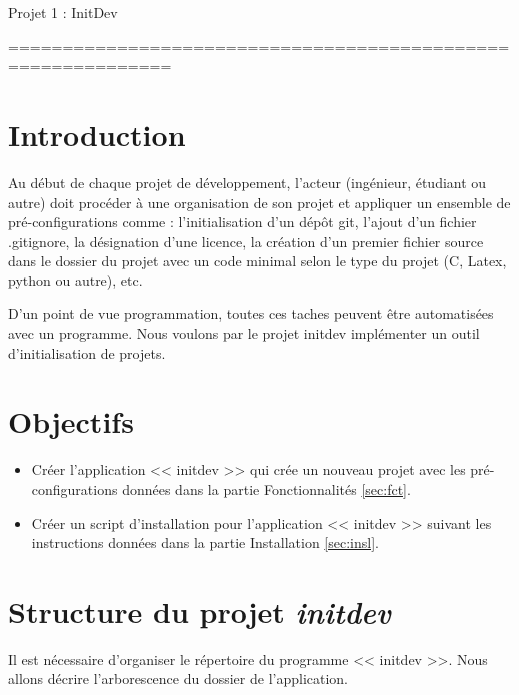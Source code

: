 \documentclass[10pt,a4paper]{article}
\begin{document}
\begin{center}
\huge{Projet 1 : InitDev}
\end{center}
=============================================================

\section{Introduction}
Au début de chaque projet de développement, l'acteur (ingénieur, étudiant ou autre) doit procéder à une organisation de son projet et appliquer un ensemble de pré-configurations comme : l'initialisation d'un dépôt git, l'ajout d'un fichier .gitignore, la désignation d'une licence, la création d'un premier fichier source dans le dossier du projet avec un code minimal selon le type du projet (C, Latex, python ou autre), etc.

D'un point de vue programmation, toutes ces taches peuvent être automatisées avec un programme. Nous voulons par le projet initdev implémenter un outil d'initialisation de projets. 

\section{Objectifs}
\begin{itemize}
\item Créer l'application << initdev >> qui crée un nouveau projet avec les pré-configurations données dans la partie Fonctionnalités \ref{sec:fct}.
\item Créer un script d'installation pour l'application << initdev >> suivant les instructions données dans la partie Installation \ref{sec:insl}. 
\end{itemize}

\section{Structure du projet \emph{initdev}}
Il est nécessaire d'organiser le répertoire du programme << initdev >>. Nous allons décrire l'arborescence du dossier de l'application.
\end{document}
